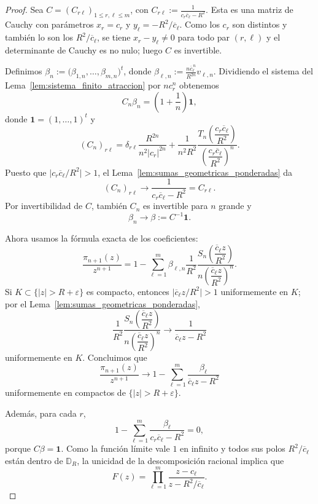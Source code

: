 \begin{proof}
	Sea $C=(C_{r\ell})_{1\le r,\ell\le m}$, con $C_{r\ell}:=\frac{1}{c_r\overline c_\ell-R^2}$.
	Esta es una matriz de Cauchy con parámetros $x_r=c_r$ y $y_\ell=-R^2/\overline c_\ell$. Como los $c_r$ son distintos y también lo son los $R^2/\overline c_\ell$, se tiene $x_r-y_\ell\neq0$ para todo par $(r,\ell)$ y el determinante de Cauchy es no nulo; luego $C$ es invertible.

	Definimos $\beta_n:=\bigl(\beta_{1,n},\dots,\beta_{m,n}\bigr)^t$, donde $\beta_{\ell,n}:=\frac{n\overline c_\ell^{\,n}}{R^{2n}}v_{\ell,n}$.
	Dividiendo el sistema del Lema~\ref{lem:sistema_finito_atraccion} por $nc_r^n$ obtenemos
	\[
		C_n\beta_n=\left(1+\frac1n\right)\mathbf 1,
	\]
	donde $\mathbf 1=(1,\dots,1)^t$ y
	\[
		(C_n)_{r\ell}
		=
		\delta_{r\ell}\frac{R^{2n}}{n^2|c_r|^{2n}}
		+
		\frac{1}{n^2R^2}
		\frac{T_n\!\left(\dfrac{c_r\overline c_\ell}{R^2}\right)}{\left(\dfrac{c_r\overline c_\ell}{R^2}\right)^n}.
	\]
	Puesto que $\bigl|c_r\overline c_\ell/R^2\bigr|>1$, el Lema~\ref{lem:sumas_geometricas_ponderadas} da
	\[
		(C_n)_{r\ell}\longrightarrow \frac{1}{c_r\overline c_\ell-R^2}=C_{r\ell}.
	\]
	Por invertibilidad de $C$, también $C_n$ es invertible para $n$ grande y
	\[
		\beta_n\longrightarrow \beta:=C^{-1}\mathbf 1.
	\]

	Ahora usamos la fórmula exacta de los coeficientes:
	\[
		\frac{\pi_{n+1}(z)}{z^{n+1}}
		=
		1-
		\sum_{\ell=1}^m
		\beta_{\ell,n}
		\frac{1}{R^2}
		\frac{S_n\!\left(\dfrac{\overline c_\ell z}{R^2}\right)}{n\left(\dfrac{\overline c_\ell z}{R^2}\right)^n}.
	\]
	Si $K\subset\{|z|>R+\varepsilon\}$ es compacto, entonces $\bigl|\overline c_\ell z/R^2\bigr|>1$ uniformemente en $K$; por el Lema~\ref{lem:sumas_geometricas_ponderadas},
	\[
		\frac{1}{R^2}
		\frac{S_n\!\left(\dfrac{\overline c_\ell z}{R^2}\right)}{n\left(\dfrac{\overline c_\ell z}{R^2}\right)^n}
		\longrightarrow
		\frac{1}{\overline c_\ell z-R^2}
	\]
	uniformemente en $K$. Concluimos que
	\[
		\frac{\pi_{n+1}(z)}{z^{n+1}}
		\longrightarrow
		1-\sum_{\ell=1}^m\frac{\beta_\ell}{\overline c_\ell z-R^2}
	\]
	uniformemente en compactos de $\{|z|>R+\varepsilon\}$.

	Además, para cada $r$,
	\[
		1-\sum_{\ell=1}^m\frac{\beta_\ell}{c_r\overline c_\ell-R^2}=0,
	\]
	porque $C\beta=\mathbf 1$. Como la función límite vale $1$ en infinito y todos sus polos $R^2/\overline c_\ell$ están dentro de $\mathbb D_R$, la unicidad de la descomposición racional implica que
	\[
		F(z)=\prod_{\ell=1}^m\frac{z-c_\ell}{z-R^2/\overline c_\ell}.
	\]


\end{proof}
